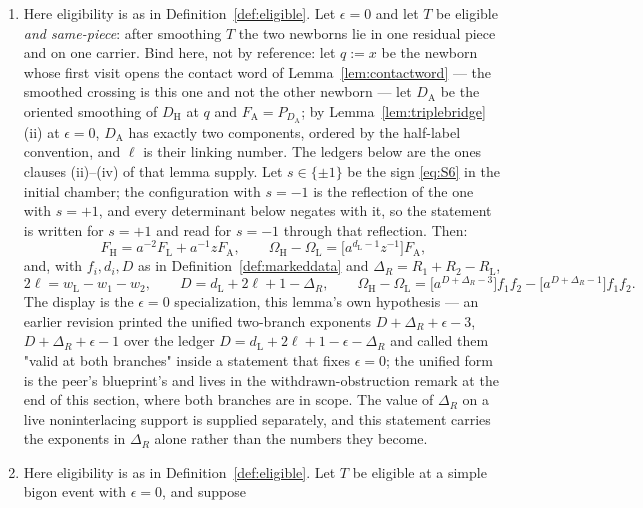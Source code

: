 \begin{lemma}\label{lem:nitransport}
\begin{enumerate}
\item[(A)] Here eligibility is as in Definition~\ref{def:eligible}.
Let $\epsilon=0$ and let $T$ be eligible \emph{and same-piece}: after smoothing
$T$ the two newborns lie in one residual piece and on one carrier. Bind here, not by reference: let $q:=x$ be the newborn whose first visit opens
the contact word of Lemma~\ref{lem:contactword} --- the smoothed crossing is
this one and not the other newborn --- let $D_{\mathrm A}$ be the oriented
smoothing of $D_{\mathrm H}$ at $q$ and $F_{\mathrm A}=P_{D_{\mathrm A}}$; by
Lemma~\ref{lem:triplebridge}(ii) at $\epsilon=0$, $D_{\mathrm A}$ has exactly
two components, ordered by the half-label convention, and $\ell$ is their
linking number. The ledgers below are the ones clauses (ii)--(iv) of that
lemma supply. Let $s\in\{\pm1\}$ be the sign
\eqref{eq:S6} in the initial chamber; the
configuration with $s=-1$ is the reflection of the one with $s=+1$, and every
determinant below negates with it, so the statement is written for $s=+1$ and
read for $s=-1$ through that reflection. Then:
\[
   F_{\mathrm H}=a^{-2}F_{\mathrm L}+a^{-1}zF_{\mathrm A},
   \qquad
   \Omega_{\mathrm H}-\Omega_{\mathrm L}=\bigl[a^{d_{\mathrm L}-1}z^{-1}\bigr]F_{\mathrm A},
\]
and, with $f_i,d_i,D$ as in Definition~\ref{def:markeddata} and
$\Delta_R=R_1+R_2-R_{\mathrm L}$,
\[
   2\ell=w_{\mathrm L}-w_1-w_2,
   \qquad
   D=d_{\mathrm L}+2\ell+1-\Delta_R,
   \qquad
   \Omega_{\mathrm H}-\Omega_{\mathrm L}
   =\bigl[a^{D+\Delta_R-3}\bigr]f_1f_2
    -\bigl[a^{D+\Delta_R-1}\bigr]f_1f_2 .
\]
The display is the $\epsilon=0$ specialization, this lemma's own hypothesis ---
an earlier revision printed the unified two-branch exponents
$D+\Delta_R+\epsilon-3$, $D+\Delta_R+\epsilon-1$ over the ledger
$D=d_{\mathrm L}+2\ell+1-\epsilon-\Delta_R$ and called them "valid at both
branches" inside a statement that fixes $\epsilon=0$; the unified form is the
peer's blueprint's and lives in the withdrawn-obstruction remark at the end of
this section, where both branches are in scope. The value of
$\Delta_R$ on a live noninterlacing support is supplied separately, and this
statement carries the exponents in $\Delta_R$ alone rather than the numbers
they become.
\item[(B)] Here eligibility is as in Definition~\ref{def:eligible}.
Let $T$ be eligible at a simple bigon event with $\epsilon=0$, and suppose

\end{enumerate}
\end{lemma}
